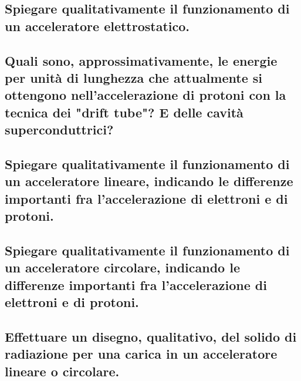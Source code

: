 \subsection[]{Spiegare qualitativamente il funzionamento di un acceleratore elettrostatico.}

\subsection[]{Quali sono, approssimativamente, le energie per unità di lunghezza che attualmente si ottengono nell’accelerazione di protoni con la tecnica dei "drift tube"? E delle cavità superconduttrici?}
\subsection[]{Spiegare qualitativamente il funzionamento di un acceleratore lineare, indicando le differenze importanti fra l’accelerazione di elettroni e di protoni.}

\subsection[]{Spiegare qualitativamente il funzionamento di un acceleratore circolare, indicando le differenze importanti fra l’accelerazione di elettroni e di protoni.}

\subsection[]{Effettuare un disegno, qualitativo, del solido di radiazione per una carica in un acceleratore lineare o circolare.}

